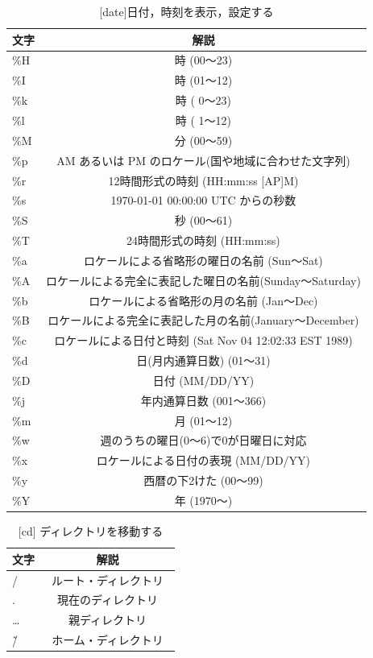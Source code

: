 \begin{table}[H]
  \begin{center}
    \caption{[date]日付，時刻を表示，設定する}
    \begin{tabular}{|l|c|} \hline
      文字 & 解説  \\ \hline
\%H & 時 (00～23) \\
\%I & 時 (01～12) \\
\%k & 時 ( 0～23) \\
\%l & 時 ( 1～12) \\
\%M & 分 (00～59) \\
\%p & AM あるいは PM のロケール(国や地域に合わせた文字列) \\
\%r & 12時間形式の時刻 (HH:mm:ss [AP]M) \\
\%s & 1970-01-01 00:00:00 UTC からの秒数 \\
\%S & 秒 (00～61) \\
\%T & 24時間形式の時刻 (HH:mm:ss) \\
\%a & ロケールによる省略形の曜日の名前 (Sun～Sat) \\
\%A & ロケールによる完全に表記した曜日の名前(Sunday～Saturday) \\
\%b & ロケールによる省略形の月の名前 (Jan～Dec) \\
\%B & ロケールによる完全に表記した月の名前(January～December) \\
\%c & ロケールによる日付と時刻 (Sat Nov 04 12:02:33 EST 1989) \\
\%d & 日(月内通算日数) (01～31) \\
\%D & 日付 (MM/DD/YY) \\
\%j & 年内通算日数 (001～366) \\
\%m & 月 (01～12) \\
\%w & 週のうちの曜日(0～6)で0が日曜日に対応 \\
\%x & ロケールによる日付の表現 (MM/DD/YY) \\
\%y & 西暦の下2けた (00～99) \\
\%Y & 年 (1970～) \\ \hline
 \end{tabular}
  \end{center}
\end{table}


\begin{table}[H]
  \begin{center}
    \caption{[cd] ディレクトリを移動する}
    \begin{tabular}{|l|c|} \hline
      文字 & 解説  \\ \hline
   / & ルート・ディレクトリ　\\
    . & 現在のディレクトリ　\\
   … & 親ディレクトリ　\\
  \~/ & ホーム・ディレクトリ　\\ \hline
    \end{tabular}
  \end{center}
\end{table}

